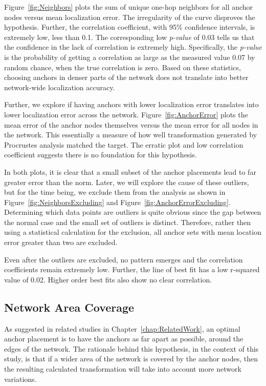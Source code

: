 Figure~\ref{fig:Neighbors} plots the sum of unique one-hop neighbors for all anchor nodes versus mean localization error.  The irregularity of the curve disproves the hypothesis. Further, the correlation coefficient, with 95\% confidence intervals, is extremely low, less than 0.1. The corresponding low \emph{p-value} of 0.03 tells us that the confidence in the lack of correlation is extremely high. Specifically, the \emph{p-value} is the probability of getting a correlation as large as the measured value 0.07 by random chance, when the true correlation is zero. Based on these statistics, choosing anchors in denser parts of the network does not translate into better network-wide localization accuracy.

Further, we explore if having anchors with lower localization error translates into lower localization error across the network. Figure~\ref{fig:AnchorError} plots the mean error of the anchor nodes themselves versus the mean error for all nodes in the network. This essentially a measure of how well transformation generated by Procrustes analysis matched the target.  The erratic plot and low correlation coefficient suggests there is no foundation for this hypothesis.  

In both plots, it is clear that a small subset of the anchor placements lead to far greater error than the norm.  Later, we will explore the cause of these outliers, but for the time being, we exclude them from the analysis as shown in Figure~\ref{fig:NeighborsExcluding} and Figure~\ref{fig:AnchorErrorExcluding}. Determining which data points are outliers is quite obvious since the gap between the normal case and the small set of outliers is distinct. Therefore, rather then using a statistical calculation for the exclusion, all anchor sets with mean location error greater than two are excluded.

Even after the outliers are excluded, no pattern emerges and the correlation coefficients remain extremely low.  Further, the line of best fit has a low r-squared value of 0.02.  Higher order best fits also show no clear correlation.

\subsection{Network Area Coverage}
\label{sec:anchorcoverage}
As suggested in related studies in Chapter~\ref{chap:RelatedWork}, an optimal anchor placement is to have the anchors as far apart as possible, around the edges of the network.  The rationale behind this hypothesis, in the context of this study, is that if a wider area of the network is covered by the anchor nodes, then the resulting calculated transformation will take into account more network variations.

